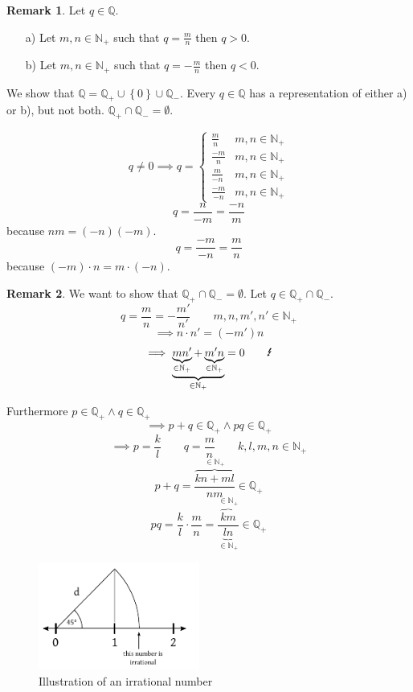 \documentclass[a4paper,landscape,twocolumn]{article}
\theoremstyle{definition}
\newtheorem{rem}{Remark}
\newcommand\set[1]{\left\{#1\right\}}
\begin{document}
\begin{rem}
  Let $q \in \mathbb{Q}$.
  \begin{itemize}
    \item[a)] Let $m,n \in \mathbb{N}_+$ such that $q = \frac mn$ then $q > 0$.
    \item[b)] Let $m,n \in \mathbb{N}_+$ such that $q = -\frac mn$ then $q < 0$.
  \end{itemize}

  We show that $\mathbb{Q} = \mathbb{Q}_+ \cup \set{0} \cup \mathbb{Q}_-$.
  Every $q \in \mathbb{Q}$ has a representation of either a) or b), but not both.
  $\mathbb{Q}_+ \cap \mathbb{Q}_- = \emptyset$.

  \[
    q \neq 0 \implies q = \begin{cases}
      \frac mn & m,n \in \mathbb{N}_+ \\
      \frac {-m}n & m,n \in \mathbb{N}_+ \\
      \frac m{-n} & m,n \in \mathbb{N}_+ \\
      \frac{-m}{-n} & m,n \in \mathbb{N}_+
    \end{cases}
  \]
  \[ q = \frac{n}{-m} = \frac{-n}{m} \]
  because $nm = (-n)(-m)$.
  \[ q = \frac{-m}{-n} = \frac mn \]
  because $(-m) \cdot n = m \cdot (-n)$.
\end{rem}

\begin{rem}
  We want to show that $\mathbb{Q}_+ \cap \mathbb{Q}_- = \emptyset$.
  Let $q \in \mathbb{Q}_+ \cap \mathbb{Q}_-$.
  \[ q = \frac mn = -\frac{m'}{n'} \qquad m,n,m',n' \in \mathbb{N}_+ \]
  \[ \implies n \cdot n' = (-m') n \]
  \[ \implies \underbrace{\underbrace{mn'}_{\in \mathbb{N}_+} + \underbrace{m' n}_{\in \mathbb{N}_+}}_{\in \mathbb{N}_+} = 0 \qquad\text{\Lightning} \]

  Furthermore $p \in \mathbb{Q}_+ \land q \in \mathbb{Q}_+$
  \[ \implies p + q \in \mathbb{Q}_+ \land pq \in \mathbb{Q}_+ \]
  \[ \implies p = \frac kl \qquad q = \frac mn \qquad k,l,m,n \in \mathbb{N}_+ \]
  \[ p + q = \frac{\overbrace{kn + ml}^{\in \mathbb{N}_+}}{nm} \in \mathbb{Q}_+ \]
  \[ pq = \frac{k}{l} \cdot \frac mn = \frac{\overbrace{km}^{\in \mathbb{N}_+}}{\underbrace{ln}_{\in \mathbb{N}_+}} \in \mathbb{Q}_+ \]
\end{rem}

\begin{figure}[!h]
  \begin{center}
    \includegraphics[width=200px]{img/irrational_number.pdf}
    \caption{Illustration of an irrational number}
  \end{center}
\end{figure}
\end{document}
